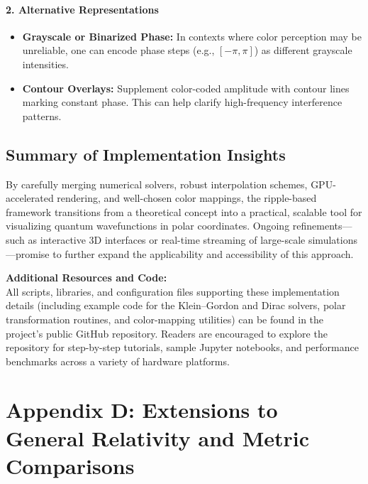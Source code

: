 \documentclass{article}
\begin{document}
\paragraph{2. Alternative Representations}
\begin{itemize}
    \item \textbf{Grayscale or Binarized Phase:} In contexts where color perception may be unreliable, one can encode phase steps (e.g., \([-\pi,\pi]\)) as different grayscale intensities.
    \item \textbf{Contour Overlays:} Supplement color-coded amplitude with contour lines marking constant phase. This can help clarify high-frequency interference patterns.
\end{itemize}

\subsection{Summary of Implementation Insights}
By carefully merging numerical solvers, robust interpolation schemes, GPU-accelerated rendering, and well-chosen color mappings, the ripple-based framework transitions from a theoretical concept into a practical, scalable tool for visualizing quantum wavefunctions in polar coordinates. Ongoing refinements—such as interactive 3D interfaces or real-time streaming of large-scale simulations—promise to further expand the applicability and accessibility of this approach.

\bigskip
\noindent
\textbf{Additional Resources and Code:}\\
All scripts, libraries, and configuration files supporting these implementation details (including example code for the Klein--Gordon and Dirac solvers, polar transformation routines, and color-mapping utilities) can be found in the project’s public GitHub repository. Readers are encouraged to explore the repository for step-by-step tutorials, sample Jupyter notebooks, and performance benchmarks across a variety of hardware platforms.

\newpage

\section{Appendix D: Extensions to General Relativity and Metric Comparisons}
\label{appendix:D}
\end{document}
